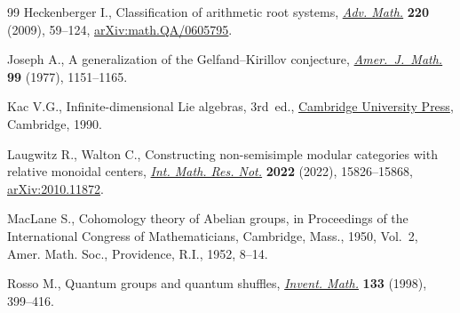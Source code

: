 \documentclass[10pt,a4paper]{amsart}
\numberwithin{equation}{section}
\begin{document}
\begin{thebibliography}{99}
Heckenberger I., Classification of arithmetic root systems, \href{https://doi.org/10.1016/j.aim.2008.08.005}{\textit{Adv. Math.}}
 \textbf{220} (2009), 59--124, \href{https://arxiv.org/abs/math.QA/0605795}{arXiv:math.QA/0605795}.

Joseph A., A generalization of the {G}elfand--{K}irillov conjecture,
 \href{https://doi.org/10.2307/2374020}{\textit{Amer.~J.~Math.}} \textbf{99} (1977), 1151--1165.

Kac V.G., Infinite-dimensional {L}ie algebras, 3rd~ed., \href{https://doi.org/10.1017/CBO9780511626234}{Cambridge University
 Press}, Cambridge, 1990.

Laugwitz R., Walton C., Constructing non-semisimple modular categories with
 relative monoidal centers, \href{https://doi.org/10.1093/imrn/rnab097}{\textit{Int. Math. Res. Not.}} \textbf{2022}
 (2022), 15826--15868, \href{https://arxiv.org/abs/2010.11872}{arXiv:2010.11872}.

MacLane S., Cohomology theory of {A}belian groups, in Proceedings of the
 {I}nternational {C}ongress of {M}athematicians, {C}ambridge, {M}ass., 1950,
 Vol.~2, Amer. Math. Soc., Providence, R.I., 1952, 8--14.

Rosso M., Quantum groups and quantum shuffles, \href{https://doi.org/10.1007/s002220050249}{\textit{Invent. Math.}}
 \textbf{133} (1998), 399--416.

\end{thebibliography}
\end{document}
